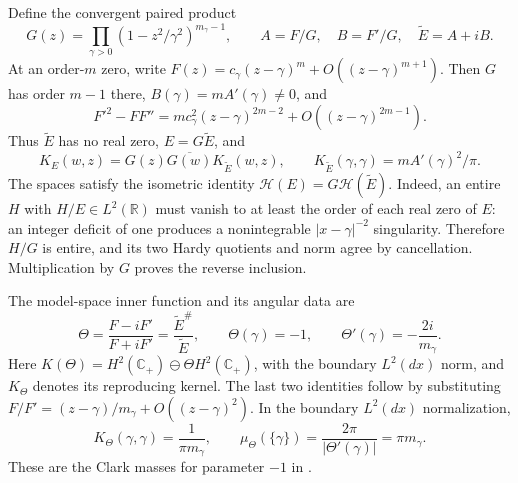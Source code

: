 Define the convergent paired product
\[
 G(z)=\prod_{\gamma>0}(1-z^2/\gamma^2)^{m_\gamma-1},
 \qquad A=F/G,\quad B=F'/G,\quad \widetilde E=A+iB.
\]
At an order-$m$ zero, write
$F(z)=c_\gamma(z-\gamma)^m+O((z-\gamma)^{m+1})$.
Then $G$ has order $m-1$ there, $B(\gamma)=mA'(\gamma)\ne0$,
and
\[
 F'^2-FF''=mc_\gamma^2(z-\gamma)^{2m-2}
                       +O((z-\gamma)^{2m-1}).
\]
Thus $\widetilde E$ has no real zero, $E=G\widetilde E$, and
\[
 K_E(w,z)=G(z)\overline{G(w)}K_{\widetilde E}(w,z),
 \qquad K_{\widetilde E}(\gamma,\gamma)
                =mA'(\gamma)^2/\pi.
\]
The spaces satisfy the isometric identity
$\mathcal H(E)=G\mathcal H(\widetilde E)$.
Indeed, an entire $H$ with $H/E\in L^2(\mathbb R)$ must
vanish to at least the order of each real zero of $E$:
an integer deficit of one produces a nonintegrable
$|x-\gamma|^{-2}$ singularity. Therefore $H/G$ is entire,
and its two Hardy quotients and norm agree by cancellation.
Multiplication by $G$ proves the reverse inclusion.

The model-space inner function and its angular data are
\[
 \Theta=\frac{F-iF'}{F+iF'}
       =\frac{\widetilde E^\#}{\widetilde E},\qquad
 \Theta(\gamma)=-1,\qquad \Theta'(\gamma)=-\frac{2i}{m_\gamma}.
\]
Here $K(\Theta)=H^2(\mathbb C_+)\ominus\Theta H^2(\mathbb C_+)$,
with the boundary $L^2(dx)$ norm, and $K_\Theta$ denotes its
reproducing kernel.
The last two identities follow by substituting
$F/F'=(z-\gamma)/m_\gamma+O((z-\gamma)^2)$.
In the boundary $L^2(dx)$ normalization,
\[
 K_\Theta(\gamma,\gamma)=\frac1{\pi m_\gamma},
 \qquad
 \mu_\Theta(\{\gamma\})=\frac{2\pi}{|\Theta'(\gamma)|}
                       =\pi m_\gamma.
\]
These are the Clark masses for parameter $-1$ in
\cite[Section~2.4, equation~(2.8), and Proposition~4.1,
pp.~6--7, 10--11]{suzuki-weil2025}.


